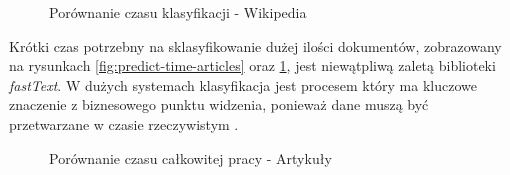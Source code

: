 \begin{figure}[ht!]
	\centering
    \qquad
	\caption{Porównanie czasu klasyfikacji - Wikipedia}
    \label{fig:predict-time-wikipedia}
\end{figure}

Krótki czas potrzebny na sklasyfikowanie dużej ilości dokumentów, zobrazowany na rysunkach \ref{fig:predict-time-articles} oraz \ref{fig:predict-time-wikipedia}, jest niewątpliwą zaletą biblioteki \textit{fastText}. W dużych systemach klasyfikacja jest procesem który  ma kluczowe znaczenie z biznesowego punktu widzenia, ponieważ dane muszą być przetwarzane w czasie rzeczywistym \cite{faster-better-fasttext}. 


\begin{figure}[ht!]
	\centering
    \qquad
	\caption{Porównanie czasu całkowitej pracy - Artykuły}
    \label{fig:total-time-articles}
\end{figure}

